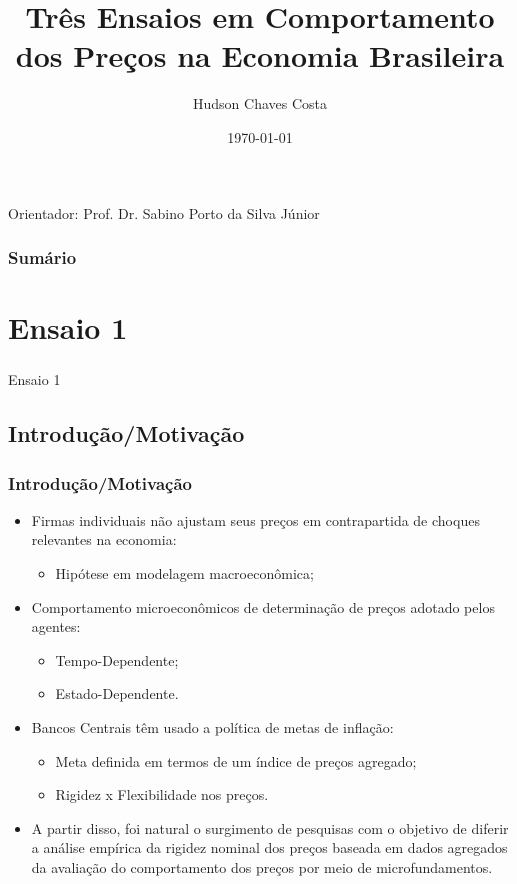 \documentclass[aspectratio=169]{beamer}
\title[\sc{Três Ensaios em Comportamentos dos Preços}]{Três Ensaios em Comportamento dos Preços na Economia Brasileira}
\author{Hudson Chaves Costa}
\institute{PPGE - UFRGS}
\date{\today}
\begin{document}



\begin{frame}
  \titlepage
Orientador: Prof. Dr. Sabino Porto da Silva Júnior
\end{frame}

\begin{frame}[plain]\frametitle{Sumário}
\small\tableofcontents
\end{frame}

\section{Ensaio 1}
  
\begin{frame}\frametitle{}
	\begin{center}
	{\Huge Ensaio 1}
	\end{center}
\end{frame}

\subsection{Introdução/Motivação}

\begin{frame}\frametitle{Introdução/Motivação}
  \begin{itemize}
  \item Firmas individuais não ajustam seus preços em contrapartida de choques relevantes na economia:
    \begin{itemize}
    \item Hipótese em modelagem macroeconômica;
    \end{itemize}
  \item Comportamento microeconômicos de determinação de preços adotado pelos agentes:
    \begin{itemize}
    \item Tempo-Dependente;
    \item Estado-Dependente.
    \end{itemize}
  \item Bancos Centrais têm usado a política de metas de inflação:
    \begin{itemize}
    \item Meta definida em termos de um índice de preços agregado;
    \item Rigidez x Flexibilidade nos preços.
    \end{itemize}
  \item A partir disso, foi natural o surgimento de pesquisas com o objetivo de diferir a análise empírica da rigidez nominal dos preços baseada em dados agregados da avaliação do comportamento dos preços por meio de microfundamentos.
  \end{itemize}
\end{frame}
\end{document}
